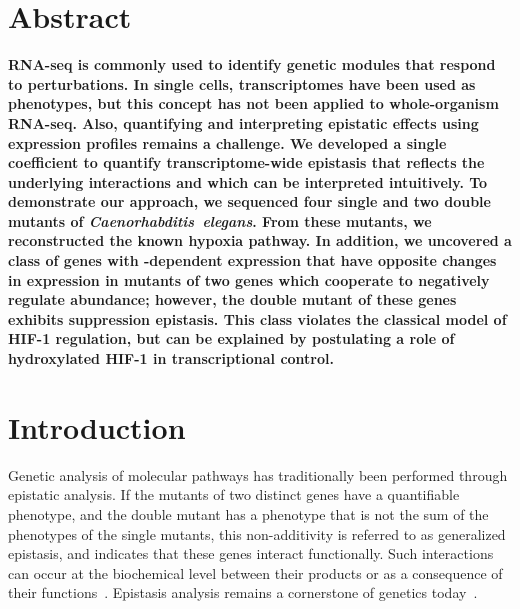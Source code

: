 \section*{Abstract}
\textbf{
RNA-seq is commonly used to identify genetic modules that respond to
perturbations. In single cells, transcriptomes have been used as phenotypes,
but this concept has not been applied to whole-organism RNA-seq. Also,
quantifying and interpreting epistatic effects using expression profiles
remains a challenge. We developed a single coefficient to quantify
transcriptome-wide epistasis that reflects the underlying interactions and
which can be interpreted intuitively. To demonstrate our approach, we
sequenced four single and two double mutants of \emph{Caenorhabditis~elegans}.
From these mutants, we reconstructed the known hypoxia pathway. In addition,
we uncovered a class of \hifohtargets{} genes with -dependent
expression that have opposite changes in expression in mutants of two genes
which cooperate to negatively regulate \hifp{} abundance; however, the double
mutant of these genes exhibits suppression epistasis. This class violates the
classical model of HIF-1 regulation, but can be explained by postulating a
role of hydroxylated HIF-1 in transcriptional control.
}
\vspace{10mm}


\section*{Introduction}
\label{sec:introduction}
Genetic analysis of molecular pathways has traditionally been performed through
epistatic analysis. If the mutants of two distinct genes have a quantifiable
phenotype, and the double mutant has a phenotype that is not the sum of the
phenotypes of the single mutants, this non-additivity is referred to as
generalized epistasis, and indicates that these genes interact functionally.
Such interactions can occur at the biochemical  level between their products or
as a consequence of their functions~\citep{Huang2006}. Epistasis analysis remains
a cornerstone of genetics today~\citep{Phillips2008}.

